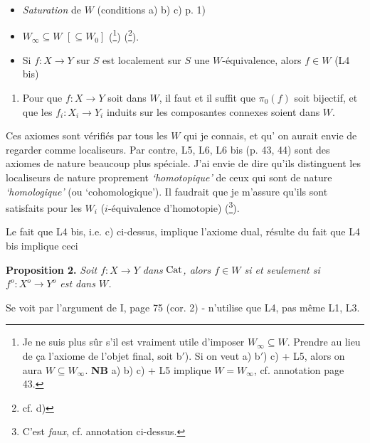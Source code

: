 \begin{itemize}
\item[a)] \textit{Saturation} de $W$ (conditions a) b) c) p. 1)

\item[b)] $W_\infty \subseteq W$ $[\subseteq W_0]$ (\footnote[30]{Je ne suis plus sûr s'il est vraiment utile d'imposer $W_\infty \subseteq W$. Prendre au lieu de ça l'axiome de l'objet final, soit b$'$). Si on veut a) b$'$) c) + L5, alors on aura $W \subseteq W_\infty$. \textbf{NB} a) b) c) + L5 implique $W = W_\infty$, cf. annotation page 43.}) (\footnote[31]{cf. d)}).

\item[c)] Si $f : X \longrightarrow Y$ sur $S$ est localement sur $S$ une $W$-équivalence, alors $f \in W$ (L4 bis)
\end{itemize}


\begin{enumerate}[leftmargin=*]
\item[d)] Pour que $f : X \longrightarrow Y$ soit dans $W$, il faut et il suffit que $\pi_0(f)$ soit bijectif, et que les $f_i : X_i \longrightarrow Y_i$ induits sur les composantes connexes soient dans $W$.
\end{enumerate}

Ces axiomes sont vérifiés par tous les $W$ qui je connais, et qu' on aurait envie de regarder comme localiseurs. Par contre, L5, L6, L6 bis (p. 43, 44) sont des axiomes de nature beaucoup plus spéciale. J'ai envie de dire qu'ils distinguent les localiseurs de nature proprement \textit{`homotopique'} de ceux qui sont de nature \textit{`homologique'} (ou `cohomologique'). Il faudrait que je m'assure qu'ils sont satisfaits pour les $W_i$ ($i$-équivalence d'homotopie) (\footnote[32]{C'est \textit{faux}, cf. annotation ci-dessus.}). %

Le fait que L4 bis, i.e. c) ci-dessus, implique l'axiome dual, résulte du fait que L4 bis implique ceci

\textbf{Proposition 2.} \textit{Soit $f : X \longrightarrow Y$ dans} $\mathrm{Cat}$\textit{, alors $f \in W$ si et seulement si $f^o : X^o \longrightarrow Y^o$ est dans $W$.}

Se voit par l'argument de I, page 75 (cor. 2) - n'utilise que L4, pas même L1, L3.


